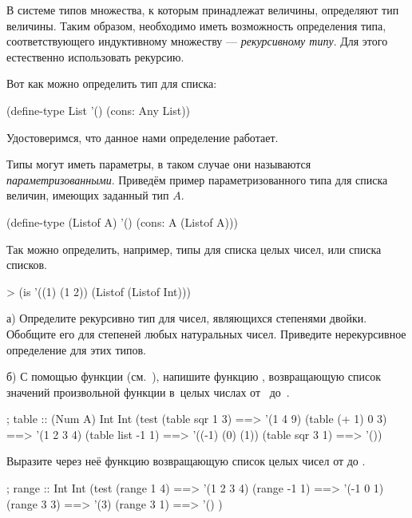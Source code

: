 В системе типов \Scheme множества, к которым принадлежат величины, определяют тип величины. Таким образом, необходимо иметь возможность определения типа, соответствующего индуктивному множеству --- \emph{рекурсивному типу}. Для этого естественно использовать рекурсию.

Вот как можно определить тип для списка:

\begin{SchemeCode}
(define-type List
  '()
  (cons: Any List))
\end{SchemeCode}

\begin{example}{Удостоверимся, что данное нами определение работает.}
\end{example}

Типы могут иметь параметры, в таком случае они называются \emph{параметризованными}. Приведём пример параметризованного типа для списка величин, имеющих заданный тип $A$.

\begin{SchemeCode}[emph={A}]
(define-type (Listof A)
  '()
  (cons: A (Listof A)))
\end{SchemeCode}


\begin{example}{Так можно определить, например, типы для списка целых чисел, или списка списков.}
\begin{ExampleCode}
> (is '((1) (1 2))
      (Listof (Listof Int)))
\end{ExampleCode}
\end{example}

\begin{Assignment}
а) Определите рекурсивно тип для чисел, являющихся степенями двойки. Обобщите его для степеней любых натуральных чисел. Приведите нерекурсивное определение для этих типов.
\medskip

б) С помощью функции  (см.~), напишите функцию , возвращающую список значений произвольной функции  в~целых числах от~ до~.

\begin{Specification}
; table :: (Num \arrow A) Int Int \arrow [A]
(test 
  (table sqr 1 3)    ==> '(1 4 9)
  (table (+ 1) 0 3)  ==> '(1 2 3 4)
  (table list -1 1)  ==> '((-1) (0) (1))
  (table sqr 3 1)    ==> '())
\end{Specification}

Выразите через неё функцию  возвращающую список целых чисел от  до .
\begin{Specification}
; range :: Int Int \arrow [Int]
(test 
  (range 1 4)   ==> '(1 2 3 4)
  (range -1 1)  ==> '(-1 0 1)
  (range 3 3)   ==> '(3)
  (range 3 1)   ==> '() )
\end{Specification}
\end{Assignment}

